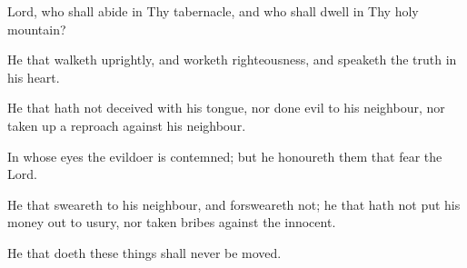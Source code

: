 Lord, who shall abide in Thy tabernacle, and who shall dwell in Thy holy mountain?

He that walketh uprightly, and worketh righteousness, and speaketh the truth in his heart.

He that hath not deceived with his tongue, nor done evil to his neighbour, nor taken up a reproach against his neighbour.

In whose eyes the evildoer is contemned; but he honoureth them that fear the Lord.

He that sweareth to his neighbour, and forsweareth not; he that hath not put his money out to usury, nor taken bribes against the innocent.

He that doeth these things shall never be moved.
